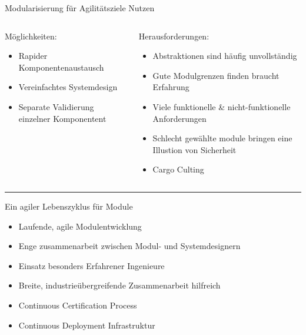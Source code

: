 \begin{frame}{Modularisierung für Agilitätsziele Nutzen}
  \begin{columns}[t,fullwidth]
    \begin{column}{.3\linewidth}
      Möglichkeiten:
      \tiny
      \vspace{0.5em}
      \begin{itemize}
        \item Rapider Komponentenaustausch
        \item Vereinfachtes Systemdesign
        \item Separate Validierung einzelner Komponentent
      \end{itemize}
    \end{column}

    \vrule

    \begin{column}{.65\linewidth}
      Herausforderungen:
      \tiny
      \vspace{0.5em}
      \begin{itemize}
        \item Abstraktionen sind häufig unvollständig
        \item Gute Modulgrenzen finden braucht Erfahrung
        \item Viele funktionelle \& nicht-funktionelle Anforderungen
        \item Schlecht gewählte module bringen eine Illustion von Sicherheit
        \item Cargo Culting
      \end{itemize}
    \end{column}

  \end{columns}

  \hrule

  Ein agiler Lebenszyklus für Module

    \tiny
  \begin{itemize}
    \item Laufende, agile Modulentwicklung
    \item Enge zusammenarbeit zwischen Modul- und Systemdesignern
    \item Einsatz besonders Erfahrener Ingenieure
    \item Breite, industrieübergreifende Zusammenarbeit hilfreich
    \item Continuous Certification Process
    \item Continuous Deployment Infrastruktur
  \end{itemize}

\end{frame}


